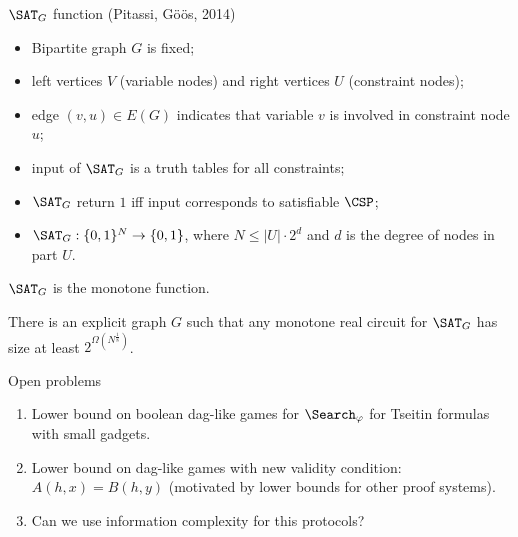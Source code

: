 \begin{frame}{$\SAT_{G}$ function (Pitassi, G{\"{o}}{\"{o}}s, 2014)}

    \begin{itemize}
        \pause
        \item Bipartite graph $G$ is fixed;
        \pause
        \item left vertices $V$ (variable nodes) and right vertices $U$ (constraint nodes);
        \pause
        \item edge $(v, u) \in E(G)$ indicates that variable $v$ is involved in constraint node $u$;
        \pause
        \item input of $\SAT_{G}$ is a truth tables for all constraints;
        \pause
        \item $\SAT_{G}$ return $1$ iff input corresponds to satisfiable $\CSP$;
        \pause
        \item $\SAT_{G}: \{0, 1\}^N \to \{0, 1\}$, where $N \le |U| \cdot 2^d$ and $d$ is the
            degree of nodes in part $U$.
    \end{itemize}

    $\SAT_{G}$ is the monotone function.

    \pause
    \begin{theorem}
        There is an explicit graph $G$ such that any monotone real circuit for $\SAT_{G}$ has size at
        least $2^{\Omega(N^{\frac{1}{8}})}$.
    \end{theorem}
\end{frame}

\begin{frame}{Open problems}
    \begin{enumerate}
            
        \pause
        \item Lower bound on boolean dag-like games for $\Search_{\varphi}$ for Tseitin formulas with small
            gadgets.
        \pause
        \item Lower bound on dag-like games with new validity condition: $A(h, x) = B(h, y)$ (motivated
            by lower bounds for other proof systems).
        \pause
        \item Can we use information complexity for this protocols?
    \end{enumerate}
\end{frame}